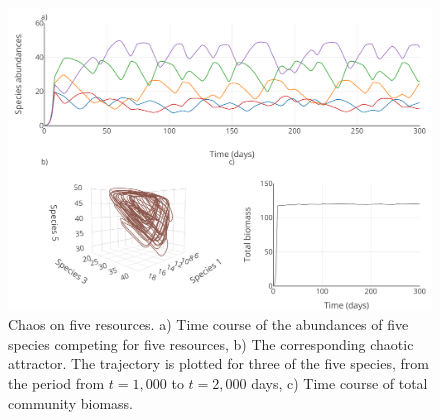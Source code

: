 \begin{figure}[H]
\begin{center} 
 \includegraphics[width=1\textwidth]{../Code/Figures/Figure_2.pdf}
  \caption{Chaos on five resources. a) Time course of the abundances of five species competing for five resources, b) The corresponding chaotic attractor. The trajectory is plotted for three of the five species, from the period from $t= 1,000$ to $t=2,000$ days, c) Time course of total community biomass.}
  \label{figures:Fig2}
\end{center}
\end{figure}

